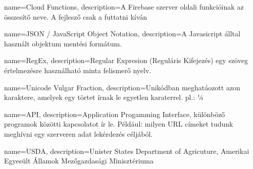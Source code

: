 {
        name=Cloud Functions,
        description={A Firebase szerver oldali funkcióinak az összesítő neve. A fejlesző csak a futtatni kíván}
}

{
        name=JSON / JavaScript Object Notation,
        description={A Javasicript álltal használt objektum mentési formátum.}
}

{
        name=RegEx,
        description={Regular Expresion (Reguláris Kifejezés) egy szöveg értelmezésre használható minta felismerő nyelv.}
}

{
        name=Unicode Vulgar Fraction,
        description={Unikódban meghatáozott azon karaktere, amelyek egy törtet írnak le egyetlen karaterrel. pl.: ¼}
}


{
        name=API,
        description={Application Progamming Interface, különböző programok közötti kapcsolatot ír le. 
        Például: milyen URL címeket tudunk meghívni egy szerveren adat lekérdezés céljából.}
}

{
        name=USDA,
        description={Unister States Department of Agricuture, Amerikai Egyesült Államok Mezőgazdasági Minisztériuma }
}
